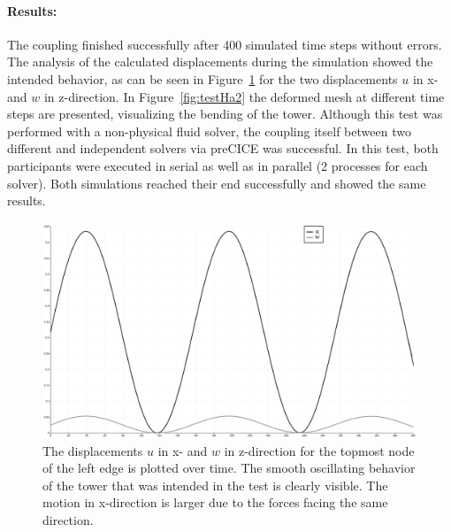   \paragraph{Results:} The coupling finished successfully after 400 simulated time steps without errors. The analysis of the calculated displacements during the simulation showed the intended behavior, as can be seen in Figure~\ref{fig:testHa1} for the two displacements $u$ in x- and $w$ in z-direction. In Figure~\ref{fig:testHa2} the deformed mesh at different time steps are presented, visualizing the bending of the tower. Although this test was performed with a non-physical fluid solver, the coupling itself between two different and independent solvers via preCICE was successful. In this test, both participants were executed in serial as well as in parallel (2 processes for each solver). Both simulations reached their end successfully and showed the same results.

  \begin{figure}[htbp]
   \centering
   \includegraphics[width=1.0\linewidth]{figures/i-beam_w}
   \caption{The displacements $u$ in x- and $w$ in z-direction for the topmost node of the left edge is plotted over time. The smooth oscillating behavior of the tower that was intended in the test is clearly visible. The motion in x-direction is larger due to the forces facing the same direction.}
   \label{fig:testHa1}
  \end{figure}    

